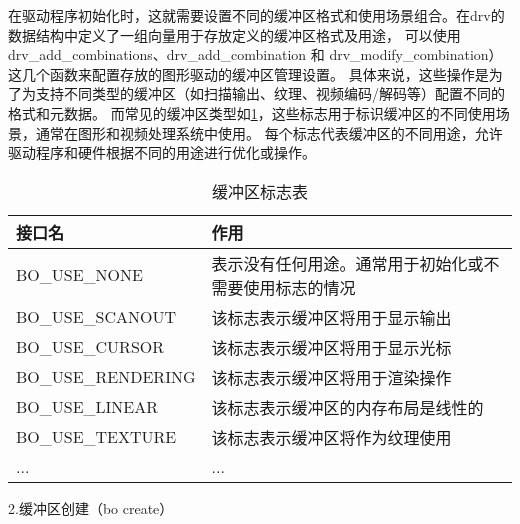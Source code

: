 在驱动程序初始化时，这就需要设置不同的缓冲区格式和使用场景组合。在drv的数据结构中定义了一组向量用于存放定义的缓冲区格式及用途，
可以使用drv\_add\_combinations、drv\_add\_combination 和 drv\_modify\_combination）这几个函数来配置存放的图形驱动的缓冲区管理设置。
具体来说，这些操作是为了为支持不同类型的缓冲区（如扫描输出、纹理、视频编码/解码等）配置不同的格式和元数据。
而常见的缓冲区类型如\ref{tab:缓冲区标志表}，这些标志用于标识缓冲区的不同使用场景，通常在图形和视频处理系统中使用。
每个标志代表缓冲区的不同用途，允许驱动程序和硬件根据不同的用途进行优化或操作。

\begin{table}[h]  
  \centering
  \caption{缓冲区标志表}
  \label{tab:缓冲区标志表}
  \begin{tabular}{ll}
    \toprule
    接口名  & 作用\\
    \midrule
    BO\_USE\_NONE & 表示没有任何用途。通常用于初始化或不需要使用标志的情况 \\
    BO\_USE\_SCANOUT & 该标志表示缓冲区将用于显示输出 \\
    BO\_USE\_CURSOR & 该标志表示缓冲区将用于显示光标 \\
    BO\_USE\_RENDERING & 该标志表示缓冲区将用于渲染操作 \\
    BO\_USE\_LINEAR & 该标志表示缓冲区的内存布局是线性的 \\
    BO\_USE\_TEXTURE & 该标志表示缓冲区将作为纹理使用 \\
    ... & ... \\
    \bottomrule
  \end{tabular}
  \note{}
\end{table}

2.缓冲区创建（bo create）

